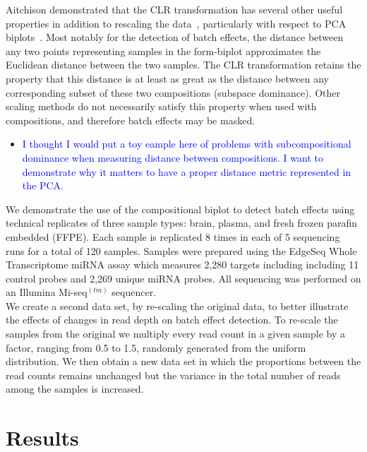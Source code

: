 \documentclass{article}\usepackage[]{graphicx}\usepackage[]{color}
\theoremstyle{definition}
\begin{document}
Aitchison demonstrated that the CLR transformation has several other useful properties in addition to rescaling the data~\cite{Aitchison1986}, particularly with respect to PCA biplots~\cite{Aitchison2002}.  Most notably for the detection of batch effects, the distance between any two points representing samples in the form-biplot approximates the Euclidean distance between the two samples.  The CLR transformation retains the property that this distance is at least as great as the distance between any corresponding subset of these two compositions (subspace dominance).  Other scaling methods do not necessarily satisfy this property when used with compositions, and therefore batch effects may be masked.\\

\begin{itemize}
\item \textcolor{blue}{I thought I would put a toy eample here of problems with subcompositional dominance when measuring distance between compositions.  I want to demonstrate why it matters to have a proper distance metric represented in the PCA.}
\end{itemize}


We demonstrate the use of the compositional biplot to detect batch effects using technical replicates of three sample types: brain, plasma, and fresh frozen parafin embedded (FFPE).  Each sample is replicated 8 times in each of 5 sequencing runs for a total of 120 samples.  Samples were prepared using the EdgeSeq Whole Transcriptome miRNA assay which measures 2,280 targets including including 11 control probes and 2,269 unique miRNA probes.  All sequencing was performed on an Illumina Mi-seq$^{(tm)}$ sequencer.\\

We create a second data set, by re-scaling the original data, to better illustrate the effects of changes in read depth on batch effect detection.  To re-scale the samples from the original we multiply every read count in a given sample by a factor, ranging from 0.5 to 1.5, randomly generated from the uniform distribution.  We then obtain a new data set in which the proportions between the read counts remains unchanged but the variance in the total number of reads among the samples is increased.\\ 

\section{Results}
\end{document}
